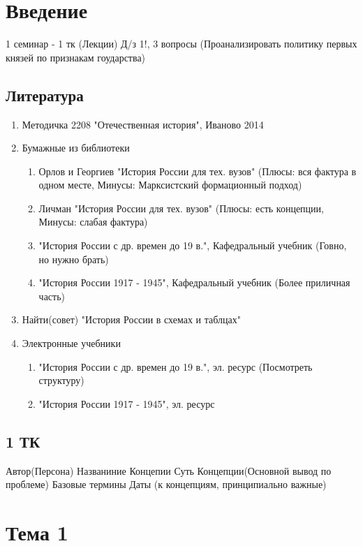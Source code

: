 \documentclass[a4paper]{article}
\begin{document}
\section{Введение}

1 семинар - 1 тк (Лекции)
Д/з 1!, 3 вопросы (Проанализировать
политику первых князей по признакам гоударства)
\subsection{Литература}

\begin{enumerate}
\item Методичка 2208
"Отечественная история", Иваново 2014
\item Бумажные из библиотеки
    \begin{enumerate}
    \item Орлов и Георгиев "История России для тех. вузов"
    (Плюсы: вся фактура в одном месте, Минусы: Марксистский формационный подход)
    \item Личман "История России для тех. вузов"
    (Плюсы: есть концепции, Минусы: слабая фактура)
    \item "История России с др. времен до 19 в.", Кафедральный учебник
    (Говно, но нужно брать)
    \item "История России 1917 - 1945", Кафедральный учебник
    (Более приличная часть)
    \end{enumerate}
\item Найти(совет) "История России в схемах и таблцах"
\item Электронные учебники
    \begin{enumerate}
    \item "История России с др. времен до 19 в.", эл. ресурс
    (Посмотреть структуру)
    \item "История России 1917 - 1945", эл. ресурс
    \end{enumerate}
\end{enumerate}

\subsection{1 ТК}

Автор(Персона)
Названиние Концепии
Суть Концепции(Основной вывод по проблеме)
Базовые термины
Даты (к концепциям, принципиально важные)

\section{Тема 1}
\end{document}
